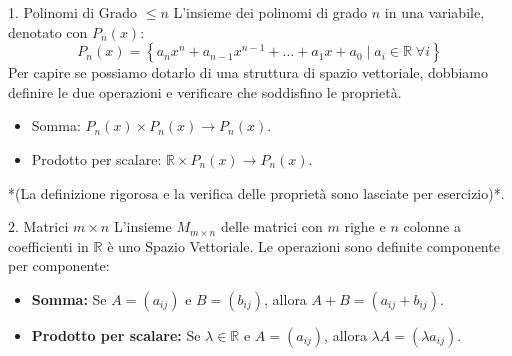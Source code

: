 \documentclass[11pt,a4paper]{article}
\begin{document}
\begin{example}{1. Polinomi di Grado $\leq n$}{}
L'insieme dei polinomi di grado $n$ in una variabile, denotato con $P_n(x)$:
$$ P_n(x) = \left\{ a_n x^n + a_{n-1} x^{n-1} + \dots + a_1 x + a_0 \mid a_i \in \mathbb{R} \;\forall i \right\} $$
Per capire se possiamo dotarlo di una struttura di spazio vettoriale, dobbiamo definire le due operazioni e verificare che soddisfino le proprietà.
\begin{itemize}
    \item Somma: $P_n(x) \times P_n(x) \longrightarrow P_n(x)$.
    \item Prodotto per scalare: $\mathbb{R} \times P_n(x) \longrightarrow P_n(x)$.
\end{itemize}
*(La definizione rigorosa e la verifica delle proprietà sono lasciate per esercizio)*.
\end{example}

\begin{example}{2. Matrici $m \times n$}{}
L'insieme $M_{m \times n}$ delle matrici con $m$ righe e $n$ colonne a coefficienti in $\mathbb{R}$ è uno Spazio Vettoriale.
Le operazioni sono definite componente per componente:
\begin{itemize}
    \item \textbf{Somma:} Se $A = (a_{ij})$ e $B = (b_{ij})$, allora $A+B = (a_{ij} + b_{ij})$.
    \item \textbf{Prodotto per scalare:} Se $\lambda \in \mathbb{R}$ e $A = (a_{ij})$, allora $\lambda A = (\lambda a_{ij})$.
\end{itemize}
\end{example}
\end{document}
